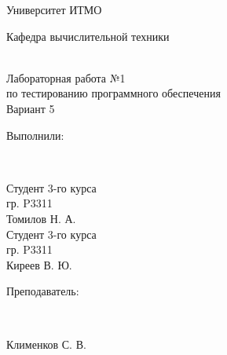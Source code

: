 \begin{titlepage}
        \newpage
        \begin{large}
                \begin{center}
                        Университет ИТМО\\

                        \vspace{5em}
                        \begin{scshape} Кафедра вычислительной техники \end{scshape}\\

                        \vspace{4em}
                        Лабораторная работа №1\\
                        по тестированию программного обеспечения\\

                        \vspace{1em}
                        Вариант 5
                \end{center}

                \begin{flushright}
                        \vspace{6em}
                        \begin{bfseries} Выполнили: \end{bfseries}\\
                        \begin{itshape}
                                Студент 3-го курса\\
                                гр. P3311\\
                                Томилов Н. А.\\
                                Студент 3-го курса\\
                                гр. P3311\\
                                Киреев В. Ю.\\
                        \end{itshape}

                        \vspace{3em}
                        \begin{bfseries} Преподаватель: \end{bfseries}\\
                        \begin{itshape}
                                Клименков С. В. \\
                        \end{itshape}
                \end{flushright}


\end{large}
\end{titlepage}
